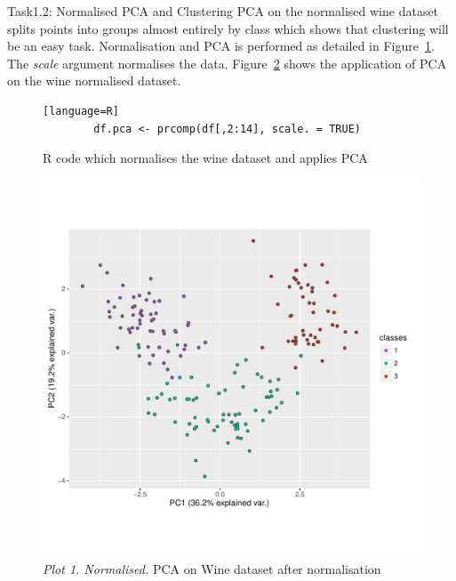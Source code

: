 \documentclass[11pt]{article}
\begin{document}
\pagebreak

\FloatBarrier\begin{subsection}{Task1.2: Normalised PCA and Clustering}
    PCA on the normalised wine dataset splits points into groups almost entirely by class which shows that clustering will be an easy task. Normalisation and PCA is performed as detailed in Figure~\ref{fig:norm_pca_r}. The \textit{scale} argument normalises the data. Figure~\ref{fig:norm_pca} shows the application of PCA on the wine normalised dataset.
    \begin{figure}[H]
	\centering
        \begin{lstlisting}[basicstyle=\ttfamily][language=R]
		df.pca <- prcomp(df[,2:14], scale. = TRUE)  
	\end{lstlisting}
	\caption{R code which normalises the wine dataset and applies PCA}
	\label{fig:norm_pca_r}
    \end{figure}


\begin{figure}[H]
    \centering
    \includegraphics[width=1.0\textwidth]{p1_n}
    \caption{\textit{Plot 1. Normalised.} PCA on Wine dataset after normalisation}
    \label{fig:norm_pca}
\end{figure} \pagebreak



\end{subsection}
\end{document}
